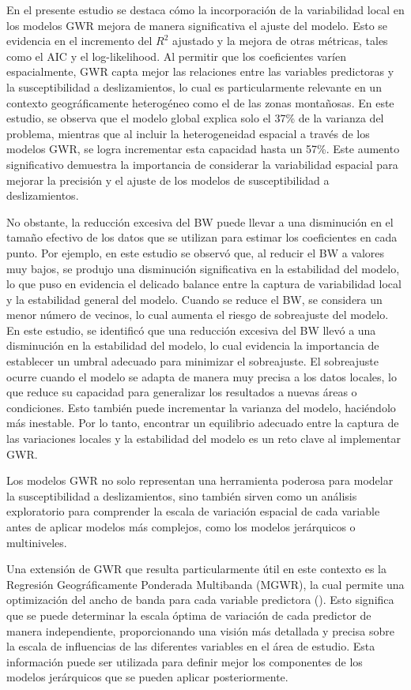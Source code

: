 \documentclass[
  manuscript=article,  
  layout=preprint,  
]{format}
\begin{document}
En el presente estudio se destaca cómo la incorporación de la variabilidad local en los modelos GWR mejora de manera significativa el ajuste del modelo. Esto se evidencia en el incremento del $R^2$ ajustado y la mejora de otras métricas, tales como el AIC y el log-likelihood. Al permitir que los coeficientes varíen espacialmente, GWR capta mejor las relaciones entre las variables predictoras y la susceptibilidad a deslizamientos, lo cual es particularmente relevante en un contexto geográficamente heterogéneo como el de las zonas montañosas. En este estudio, se observa que el modelo global explica solo el 37\% de la varianza del problema, mientras que al incluir la heterogeneidad espacial a través de los modelos GWR, se logra incrementar esta capacidad hasta un 57\%. Este aumento significativo demuestra la importancia de considerar la variabilidad espacial para mejorar la precisión y el ajuste de los modelos de susceptibilidad a deslizamientos.

No obstante, la reducción excesiva del BW puede llevar a una disminución en el tamaño efectivo de los datos que se utilizan para estimar los coeficientes en cada punto. Por ejemplo, en este estudio se observó que, al reducir el BW a valores muy bajos, se produjo una disminución significativa en la estabilidad del modelo, lo que puso en evidencia el delicado balance entre la captura de variabilidad local y la estabilidad general del modelo. Cuando se reduce el BW, se considera un menor número de vecinos, lo cual aumenta el riesgo de sobreajuste del modelo. En este estudio, se identificó que una reducción excesiva del BW llevó a una disminución en la estabilidad del modelo, lo cual evidencia la importancia de establecer un umbral adecuado para minimizar el sobreajuste. El sobreajuste ocurre cuando el modelo se adapta de manera muy precisa a los datos locales, lo que reduce su capacidad para generalizar los resultados a nuevas áreas o condiciones. Esto también puede incrementar la varianza del modelo, haciéndolo más inestable. Por lo tanto, encontrar un equilibrio adecuado entre la captura de las variaciones locales y la estabilidad del modelo es un reto clave al implementar GWR.

Los modelos GWR no solo representan una herramienta poderosa para modelar la susceptibilidad a deslizamientos, sino también sirven como un análisis exploratorio para comprender la escala de variación espacial de cada variable antes de aplicar modelos más complejos, como los modelos jerárquicos o multiniveles.

Una extensión de GWR que resulta particularmente útil en este contexto es la Regresión Geográficamente Ponderada Multibanda (MGWR), la cual permite una optimización del ancho de banda para cada variable predictora (\cite{fotheringham2017multiscale}). Esto significa que se puede determinar la escala óptima de variación de cada predictor de manera independiente, proporcionando una visión más detallada y precisa sobre la escala de influencias de las diferentes variables en el área de estudio. Esta información puede ser utilizada para definir mejor los componentes de los modelos jerárquicos que se pueden aplicar posteriormente.
\end{document}
